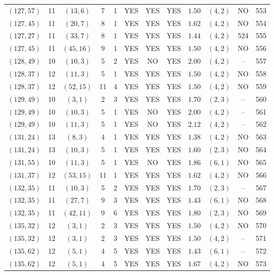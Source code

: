 \begin{longtable}{|c|c|c|c|c|c|c|c|c|c|c|c|}
$(127,57)$ & 11 & $(13,6)$ & 7 & 1 & YES & YES & YES & $1.50$ & $(4,2)$ & NO & 553\\
$(127,45)$ & 11 & $(20,7)$ & 8 & 1 & YES & YES & YES & $1.62$ & $(4,2)$ & NO & 554\\
$(127,27)$ & 11 & $(33,7)$ & 8 & 1 & YES & YES & YES & $1.44$ & $(4,2)$ & 524 & 555\\
$(127,45)$ & 11 & $(45,16)$ & 9 & 1 & YES & YES & YES & $1.50$ & $(4,2)$ & NO & 556\\
$(128,49)$ & 10 & $(10,3)$ & 5 & 2 & YES & NO & YES & $2.00$ & $(4,2)$ & -- & 557\\
$(128,37)$ & 12 & $(11,3)$ & 5 & 1 & YES & YES & YES & $1.50$ & $(4,2)$ & NO & 558\\
$(128,37)$ & 12 & $(52,15)$ & 11 & 4 & YES & YES & YES & $1.50$ & $(4,2)$ & NO & 559\\
$(129,49)$ & 10 & $(3,1)$ & 2 & 3 & YES & YES & YES & $1.70$ & $(2,3)$ & -- & 560\\
$(129,49)$ & 10 & $(10,3)$ & 5 & 1 & YES & NO & YES & $2.00$ & $(4,2)$ & -- & 561\\
$(129,49)$ & 10 & $(11,3)$ & 5 & 1 & YES & NO & YES & $2.12$ & $(4,2)$ & -- & 562\\
$(131,24)$ & 13 & $(8,3)$ & 4 & 1 & YES & YES & YES & $1.38$ & $(4,2)$ & NO & 563\\
$(131,24)$ & 13 & $(10,3)$ & 5 & 1 & YES & YES & YES & $1.60$ & $(2,3)$ & NO & 564\\
$(131,55)$ & 10 & $(11,3)$ & 5 & 1 & YES & NO & YES & $1.86$ & $(6,1)$ & NO & 565\\
$(131,37)$ & 12 & $(53,15)$ & 11 & 1 & YES & YES & YES & $1.62$ & $(4,2)$ & NO & 566\\
$(132,35)$ & 11 & $(10,3)$ & 5 & 2 & YES & YES & YES & $1.70$ & $(2,3)$ & -- & 567\\
$(132,35)$ & 11 & $(27,7)$ & 9 & 3 & YES & YES & YES & $1.43$ & $(6,1)$ & NO & 568\\
$(132,35)$ & 11 & $(42,11)$ & 9 & 6 & YES & YES & YES & $1.80$ & $(2,3)$ & NO & 569\\
$(135,32)$ & 12 & $(3,1)$ & 2 & 3 & YES & YES & YES & $1.50$ & $(4,2)$ & NO & 570\\
$(135,32)$ & 12 & $(3,1)$ & 2 & 3 & YES & YES & YES & $1.50$ & $(4,2)$ & -- & 571\\
$(135,62)$ & 12 & $(5,1)$ & 4 & 5 & YES & YES & YES & $1.43$ & $(6,1)$ & -- & 572\\
$(135,62)$ & 12 & $(5,1)$ & 4 & 5 & YES & YES & YES & $1.67$ & $(4,2)$ & NO & 573\\

\end{longtable}
